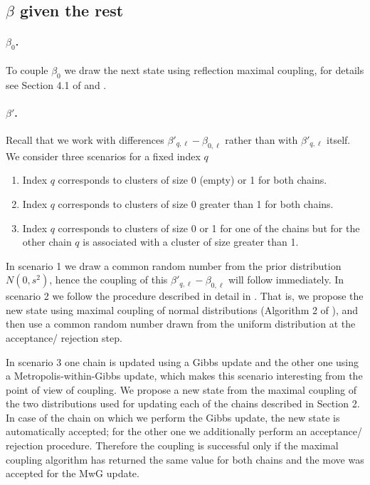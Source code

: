 \documentclass[ba]{imsart}
\begin{document}
\subsection{\texorpdfstring{$\beta$}{beta} given the rest}
\paragraph{$\beta_{0}$.} To couple $\beta_0$ we draw the next state using reflection maximal coupling, for details see Section 4.1 of \cite{jacob2017unbiased} and \cite{bou2018coupling}.

\paragraph{$\beta'$.} Recall that we work with differences $\beta'_{q,\ell} - \beta_{0,\ell}$ rather than with $\beta'_{q,\ell}$ itself. We consider three scenarios for a fixed index $q$
\begin{enumerate}
    \item Index $q$ corresponds to clusters of size 0 (empty) or 1 for both chains. 
    \item Index $q$ corresponds to clusters of size 0 greater than 1 for both chains.
    \item Index $q$ corresponds to clusters of size 0 or 1 for one of the chains but for the other chain $q$ is associated with a cluster of size greater than 1.
\end{enumerate}
In scenario 1 we draw a common random number from the prior distribution $N(0, s^2)$, hence the coupling of this $\beta'_{q,\ell} - \beta_{0,\ell}$ will follow immediately. In scenario 2 we follow the procedure described in detail in \cite{jacob2017unbiased}. That is, we propose the new state using maximal coupling of normal distributions (Algorithm 2 of \cite{jacob2017unbiased}), and then use a common random number drawn from the uniform distribution at the acceptance/ rejection step.

In scenario 3 one chain is updated using a Gibbs update and the other one using a Metropolis-within-Gibbs update, which makes this scenario interesting from the point of view of coupling. We propose a new state from the maximal coupling of the two distributions used for updating each of the chains described in Section 2. In case of the chain on which we perform the Gibbs update, the new state is automatically accepted; for the other one we additionally perform an acceptance/ rejection procedure. Therefore the coupling is successful only if the maximal coupling algorithm has returned the same value for both chains and the move was accepted for the MwG update.
\end{document}
